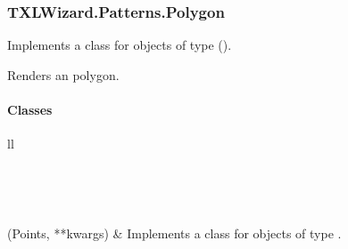\documentclass[letterpaper,10pt,english]{sphinxmanual}
\begin{document}
\subsubsection{TXLWizard.Patterns.Polygon}
\label{Chapters/PythonModuleReference/Patterns/TXLWizard.Patterns.Polygon:module-TXLWizard.Patterns.Polygon}\label{Chapters/PythonModuleReference/Patterns/TXLWizard.Patterns.Polygon:txlwizard-patterns-polygon}\label{Chapters/PythonModuleReference/Patterns/TXLWizard.Patterns.Polygon::doc}
Implements a class for  objects of type  ().

Renders an polygon.


\paragraph{Classes}
\label{Chapters/PythonModuleReference/Patterns/TXLWizard.Patterns.Polygon:classes}
\begin{longtable}{ll}
\hline
\endfirsthead

%
{{}} \\
\hline
\endhead

\hline {} \\ \hline
\endfoot

\endlastfoot


{\hyperref[Chapters/PythonModuleReference/Patterns/TXLWizard.Patterns.Polygon:TXLWizard.Patterns.Polygon.Polygon]{}}(Points, **kwargs)
 & 
Implements a class for  objects of type .
\\
\hline\end{longtable}

\end{document}
